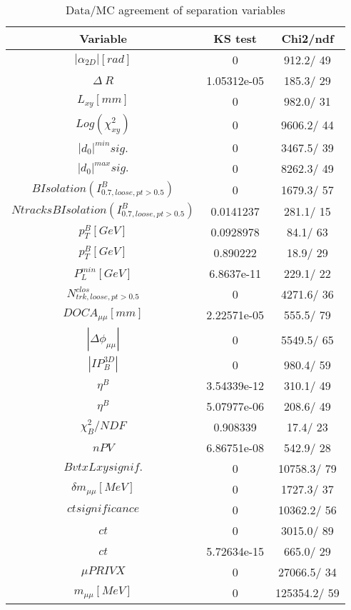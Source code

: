 \documentclass{article}
\begin{document}
\begin{table}[htbp]
\caption{\label{tab:sepVars}Data/MC agreement of separation variables}
\begin{center}
\begin{tabular}{c|c|c}
Variable & KS test & Chi2/ndf \\
\hline
$|\alpha_{2D}| [rad]$ & 0 & 912.2/ 49\\
\hline
$\Delta~R$ & 1.05312e-05 & 185.3/ 29\\
\hline
$L_{xy} [mm]$ & 0 & 982.0/ 31\\
\hline
$Log(\chi^{2}_{xy})$ & 0 & 9606.2/ 44\\
\hline
$|d_{0}|^{min} sig.$ & 0 & 3467.5/ 39\\
\hline
$|d_{0}|^{max} sig.$ & 0 & 8262.3/ 49\\
\hline
$B Isolation (I^{B}_{0.7, loose, pt>0.5})$ & 0 & 1679.3/ 57\\
\hline
$Ntracks B Isolation (I^{B}_{0.7, loose, pt>0.5})$ & 0.0141237 & 281.1/ 15\\
\hline
$p_{T}^{B} [GeV]$ & 0.0928978 &  84.1/ 63\\
\hline
$p_{T}^{B} [GeV]$ & 0.890222 &  18.9/ 29\\
\hline
$P^{min}_{L} [GeV]$ & 6.8637e-11 & 229.1/ 22\\
\hline
$N^{clos}_{trk, loose, pt>0.5}$ & 0 & 4271.6/ 36\\
\hline
$DOCA_{\mu\mu} [mm]$ & 2.22571e-05 & 555.5/ 79\\
\hline
$|\Delta\phi_{\mu\mu}|$ & 0 & 5549.5/ 65\\
\hline
$|IP_{B}^{3D}|$ & 0 & 980.4/ 59\\
\hline
$\eta^{B}$ & 3.54339e-12 & 310.1/ 49\\
\hline
$\eta^{B}$ & 5.07977e-06 & 208.6/ 49\\
\hline
$\chi^{2}_{B}/NDF$ & 0.908339 &  17.4/ 23\\
\hline
$nPV$ & 6.86751e-08 & 542.9/ 28\\
\hline
$BvtxLxy signif.$ & 0 & 10758.3/ 79\\
\hline
$\delta m_{\mu\mu} [MeV]$ & 0 & 1727.3/ 37\\
\hline
$ct significance$ & 0 & 10362.2/ 56\\
\hline
$ct$ & 0 & 3015.0/ 89\\
\hline
$ct$ & 5.72634e-15 & 665.0/ 29\\
\hline
$\mu PRIVX$ & 0 & 27066.5/ 34\\
\hline
$m_{\mu\mu} [MeV]$ & 0 & 125354.2/ 59\\

\end{tabular}
\end{center}
\end{table}
\end{document}
